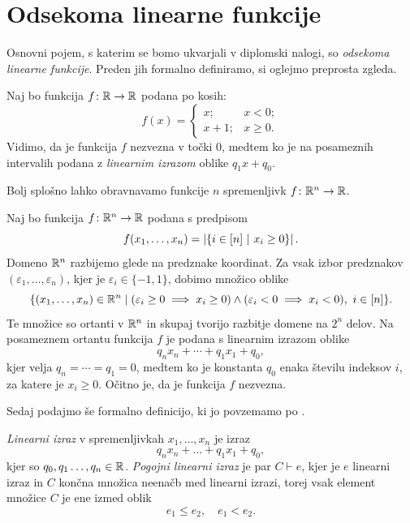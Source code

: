 \section{Odsekoma linearne funkcije}
Osnovni pojem, s katerim se bomo ukvarjali v diplomski nalogi, so \emph{odsekoma linearne funkcije}. Preden jih formalno definiramo, si oglejmo preprosta zgleda.

\begin{zgled}
  \label{zgl:olf-simple}
  Naj bo funkcija \(f \colon \mathbb{R} \to \mathbb{R}\) podana po kosih:
  \[
    f(x) = \begin{cases}
      x; &x<0;\\
      x+1; &x \geq 0.
    \end{cases}
  \]
  Vidimo, da je funkcija \(f\) nezvezna v točki \(0\), medtem ko je na posamez\-nih intervalih podana z \emph{linearnim izrazom} oblike \(q_1 x + q_0\).
\end{zgled}

Bolj splošno lahko obravnavamo funkcije \(n\) spremenljivk \(f \colon \mathbb{R}^n \to \mathbb{R}\).

\begin{zgled}
  \label{zgl:olf-ndim}
  Naj bo funkcija \(f \colon \mathbb{R}^n \to \mathbb{R}\) podana s predpisom
  \[
    f(x_1, \ldots, x_n) = \left|\left\{i \in [n] \ | \ x_i \geq 0\right\}\right|.
  \]
  Domeno \(\mathbb{R}^n\) razbijemo glede na predznake koordinat.
  Za vsak izbor predznakov \((\varepsilon_1, \ldots, \varepsilon_n)\), kjer je \(\varepsilon_i \in \{-1,1\}\), dobimo množico oblike
    \[
      \{(x_1,\ldots,x_n)\in\mathbb{R}^n \mid (\varepsilon_i \geq 0 \implies x_i \geq 0) \land (\varepsilon_i < 0 \implies x_i < 0),\ i \in [n]\}.
    \]
  Te množice so ortanti v \(\mathbb{R}^n\) in skupaj tvorijo razbitje domene na \(2^n\) delov. Na posameznem ortantu funkcija \(f \) je podana s linearnim izrazom oblike
  \[
    q_n x_n + \cdots + q_1 x_1 + q_0,
  \]
  kjer velja \(q_n = \cdots = q_1 = 0\), medtem ko je konstanta \(q_0\) enaka številu indeksov \(i\), za katere je \(x_i \geq 0\). Očitno je, da je funkcija \(f\) nezvezna. 
\end{zgled}



Sedaj podajmo še formalno definicijo, ki jo povzemamo po \cite{zbMATH06805750}.
\begin{definicija}
  \emph{Linearni izraz} v spremenljivkah \(x_1, \ldots, x_n\) je izraz
  \[
    q_nx_n + \ldots + q_1 x_1 + q_0,
  \]
kjer so \(q_0, q_1 \ldots, q_n \in \mathbb{R}\). \emph{Pogojni linearni izraz} je par \(C \vdash e\), kjer je \(e\) linearni izraz in \(C\) končna množica neenačb med linearni izrazi, torej vsak element množice \(C\) je ene izmed oblik
    \[
        e_1 \leq e_2, \quad e_1 < e_2.
    \]
\end{definicija}

